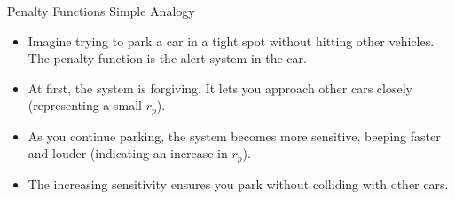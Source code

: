 \documentclass[
    NAME={Dr. Helga Ingimundardóttir},
    EMAIL={helgaingim@hi.is},
    FACULTY={Industrial Engineering},
    TITLE={Nonlinear Optimization},
    SUBTITLE={Approaches and Challenges},
    SEMINAR={VÉL113F},
    DATE={Design and Optimization}
]{../HI-latex/hi-beamer}
\begin{document}
\begin{frame}{Penalty Functions}
        \alert{Simple Analogy}
        {\footnotesize
            \begin{itemize}
                \item Imagine trying to park a car in a tight spot without hitting other vehicles. The penalty function is
                the alert system in the car.
                \item At first, the system is forgiving. It lets you approach other cars closely (representing a small \( r_p \)).
                \item As you continue parking, the system becomes more sensitive, beeping faster and louder (indicating an
                increase in \( r_p \)).
                \item The increasing sensitivity ensures you park without colliding with other cars.
            \end{itemize}
        }

    \end{frame}
\end{document}
